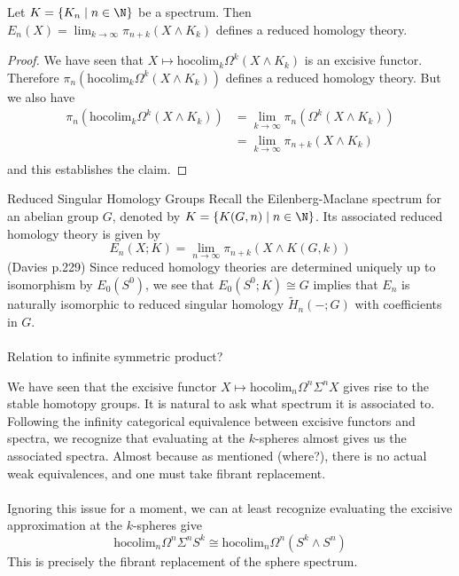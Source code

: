 \documentclass[a4paper]{article}
\begin{document}
\begin{thm}{}{} Let $K=\{K_n\;|\;n\in\N\}$ be a spectrum. Then $E_n(X)=\lim_{k\to\infty}\pi_{n+k}(X\wedge K_k)$ defines a reduced homology theory. \tcbline
\begin{proof}
We have seen that $X\mapsto\text{hocolim}_k\Omega^k(X\wedge K_k)$ is an excisive functor. Therefore $\pi_n(\text{hocolim}_k\Omega^k(X\wedge K_k))$ defines a reduced homology theory. But we also have
\begin{align*}
\pi_n(\text{hocolim}_k\Omega^k(X\wedge K_k))&=\lim_{k\to\infty}\pi_n(\Omega^k(X\wedge K_k))\\
&=\lim_{k\to\infty}\pi_{n+k}(X\wedge K_k)\\
\end{align*}
and this establishes the claim. 
\end{proof}
\end{thm}

\begin{eg}{Reduced Singular Homology Groups}{} Recall the Eilenberg-Maclane spectrum for an abelian group $G$, denoted by $K=\{K(G,n)\;|\;n\in\N\}$. Its associated reduced homology theory is given by $$E_n(X;K)=\lim_{n\to\infty}\pi_{n+k}(X\wedge K(G,k))$$ (Davies p.229) Since reduced homology theories are determined uniquely up to isomorphism by $E_0(S^0)$, we see that $E_0(S^0;K)\cong G$ implies that $E_n$ is naturally isomorphic to reduced singular homology $\widetilde{H}_n(-;G)$ with coefficients in $G$. \\~\\

Relation to infinite symmetric product?
\end{eg}

\begin{eg}{}{} We have seen that the excisive functor $X\mapsto\text{hocolim}_n\Omega^n\Sigma^nX$ gives rise to the stable homotopy groups. It is natural to ask what spectrum it is associated to. Following the infinity categorical equivalence between excisive functors and spectra, we recognize that evaluating at the $k$-spheres almost gives us the associated spectra. Almost because as mentioned (where?), there is no actual weak equivalences, and one must take fibrant replacement. \\~\\

Ignoring this issue for a moment, we can at least recognize evaluating the excisive approximation at the $k$-spheres give $$\text{hocolim}_n\Omega^n\Sigma^nS^k\cong\text{hocolim}_n\Omega^n(S^k\wedge S^n)$$ This is precisely the fibrant replacement of the sphere spectrum. 
\end{eg}
\end{document}
